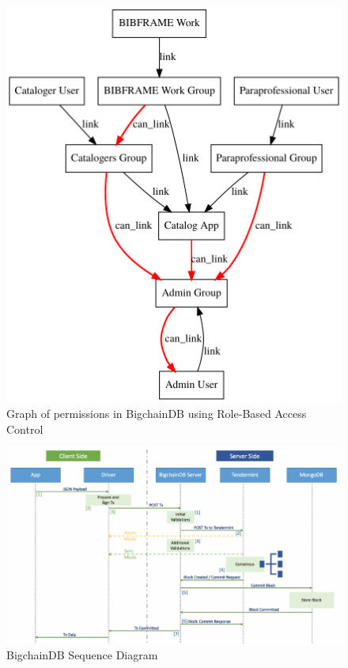 \begin{figure}[!htb]
	\centering\includegraphics[width=\columnwidth]{images/rbac-graph.pdf}  
	\caption{Graph of permissions in BigchainDB using Role-Based Access 
	Control}\label{f:rbac2}
\end{figure}

\begin{figure}[!htb]
	\centering\includegraphics[width=\columnwidth]{images/bdb-seq.pdf}  
	\caption{BigchainDB Sequence Diagram~\cite{aA17}}\label{f:bdb}
\end{figure}

